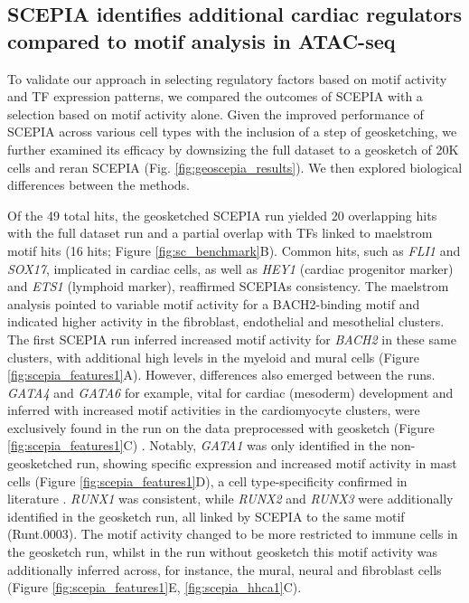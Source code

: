 \subsection{SCEPIA identifies additional cardiac regulators compared to motif analysis in ATAC-seq} 

To validate our approach in selecting regulatory factors based on motif activity and TF expression patterns, we compared the outcomes of SCEPIA with a selection based on motif activity alone. Given the improved performance of SCEPIA across various cell types with the inclusion of a step of geosketching, we further examined its efficacy by downsizing the full dataset to a geosketch of 20K cells and reran SCEPIA (Fig. \ref{fig:geoscepia_results}). We then explored biological differences between the methods.

Of the 49 total hits, the geosketched SCEPIA run yielded 20 overlapping hits with the full dataset run and a partial overlap with TFs linked to maelstrom motif hits (16 hits; Figure \ref{fig:sc_benchmark}B). Common hits, such as \textit{FLI1} and \textit{SOX17}, implicated in cardiac cells, as well as \textit{HEY1} (cardiac progenitor marker) and \textit{ETS1} (lymphoid marker), reaffirmed SCEPIAs consistency. The maelstrom analysis pointed to variable motif activity for a BACH2-binding motif and indicated higher activity in the fibroblast, endothelial and mesothelial clusters. The first SCEPIA run inferred increased motif activity for \textit{BACH2} in these same clusters, with additional high levels in the myeloid and mural cells (Figure \ref{fig:scepia_features1}A). However,  differences also emerged between the runs. \textit{GATA4} and \textit{GATA6} for example, vital for cardiac (mesoderm) development and inferred with increased motif activities in the cardiomyocyte clusters, were exclusively found in the run on the data preprocessed with geosketch (Figure \ref{fig:scepia_features1}C) \cite{Morrisey1996,Song2022}. Notably, \textit{GATA1} was only identified in the non-geosketched run, showing specific expression and increased motif activity in mast cells (Figure \ref{fig:scepia_features1}D), a cell type-specificity confirmed in literature \cite{Migliaccio2003,Gao2015}. \textit{RUNX1} was consistent, while \textit{RUNX2} and \textit{RUNX3} were additionally identified in the geosketch run, all linked by SCEPIA to the same motif (Runt.0003). The motif activity changed to be more restricted to immune cells in the geosketch run, whilst in the run without geosketch this motif activity was additionally inferred across, for instance, the mural, neural and fibroblast cells (Figure \ref{fig:scepia_features1}E, \ref{fig:scepia_hhca1}C).

